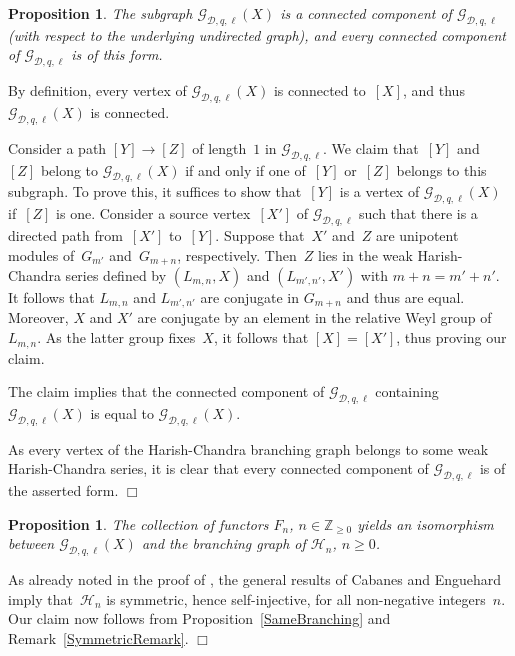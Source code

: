 \documentclass[twoside,12pt]{amsart}
\theoremstyle{plain}
\newenvironment{prf}{{\bf Proof.}}{\hfill $\Box$ \\[-1.0ex]}
\newtheorem{prp}[num]{Proposition}
\begin{document}
\begin{prp}
\label{ConnectedComponents}
The subgraph $\mathcal{G}_{\mathcal{D},q,\ell}( X )$ is a connected component
of $\mathcal{G}_{\mathcal{D},q,\ell}$ (with respect to the underlying undirected
graph), and every connected component of $\mathcal{G}_{\mathcal{D},q,\ell}$ is
of this form. 
\end{prp}
\begin{prf}
By definition, every vertex of
$\mathcal{G}_{\mathcal{D},q,\ell}( X )$ is connected to~$[X]$, and 
thus $\mathcal{G}_{\mathcal{D},q,\ell}( X )$ is connected. 

Consider a path $[Y] \rightarrow [Z]$ of length~$1$ in 
$\mathcal{G}_{\mathcal{D},q,\ell}$. 
We claim that~$[Y]$ and~$[Z]$ belong to $\mathcal{G}_{\mathcal{D},q,\ell}( X )$ 
if and only if one of~$[Y]$ or~$[Z]$ belongs to this subgraph. To prove this, it 
suffices to show that~$[Y]$ is a vertex of 
$\mathcal{G}_{\mathcal{D},q,\ell}( X )$ if~$[Z]$ is one. Consider a
source vertex~$[X']$ of $\mathcal{G}_{\mathcal{D},q,\ell}$ such that there is
a directed path from~$[X']$ to~$[Y]$. Suppose that~$X'$ and~$Z$ are unipotent 
modules of~$G_{m'}$ and~$G_{m+n}$, respectively. Then~$Z$ lies in the weak
Harish-Chandra series defined by $(L_{m,n},X)$ and $(L_{m',n'}, X')$ with
$m+n = m'+n'$. It follows that $L_{m,n}$ and $L_{m',n'}$ are conjugate in
$G_{m+n}$ and thus are equal. Moreover, $X$ and $X'$ are conjugate by an
element in the relative Weyl group of $L_{m,n}$. As the latter group fixes~$X$,
it follows that $[X] = [X']$, thus proving our claim.

The claim implies that the connected component of
$\mathcal{G}_{\mathcal{D},q,\ell}$ containing 
$\mathcal{G}_{\mathcal{D},q,\ell}( X )$ is equal to 
$\mathcal{G}_{\mathcal{D},q,\ell}( X )$. 

As every vertex of the Harish-Chandra branching graph belongs to some weak
Harish-Chandra series, it is clear that every connected component of 
$\mathcal{G}_{\mathcal{D},q,\ell}$ is of the asserted form.
\end{prf}

\begin{prp}
\label{IsomorphicBranching}
The collection of functors $F_n$, $n \in \mathbb{Z}_{\geq 0}$ yields an 
isomorphism between $\mathcal{G}_{\mathcal{D},q,\ell}(X)$ and the branching 
graph of $\mathscr{H}_n$, $n \geq 0$.
\end{prp}
\begin{prf}
As already noted in the proof of \cite[Proposition~$2.3$]{GerberHissJacon2014}, 
the general results of Cabanes and Enguehard 
\cite[Theorems 1.20(iv), 2.27]{CabanesEnguehard2004} imply that~$\mathscr{H}_n$ 
is symmetric, hence self-injective, for all non-negative integers~$n$. Our claim 
now follows from Proposition~\ref{SameBranching} and Remark~\ref{SymmetricRemark}.
\end{prf}
\end{document}
